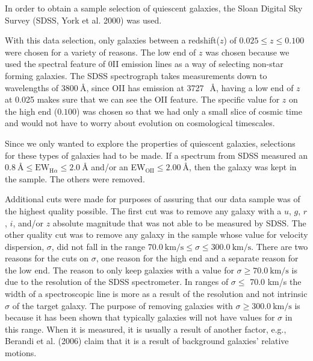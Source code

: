 \documentclass[showcase, preprintnumbers, amsmath, amssymb, bibnotes, 12pt]{revtex4}
\begin{document}
In order to obtain a sample selection of quiescent galaxies, the Sloan Digital Sky Survey (SDSS, York et al. 2000)
was used. 

With this data selection, only galaxies between a redshift($z$) of $0.025\leq z\leq0.100$ were chosen for a variety of reasons. The low end of $z$ was chosen because we used the spectral feature of 0II emission lines as a way of selecting non-star forming galaxies. The SDSS spectrograph takes measurements down to wavelengths of 3800$\ \text{\AA}$, since OII has emission at 3727~$\ \text{\AA}$, having a low end of $z$ at 0.025 makes sure that we can see the OII feature. The specific value for $z$ on the high end ($0.100$) was chosen so that we had only a small slice of cosmic time and would not have to worry about evolution on cosmological timescales.

Since we only wanted to explore the properties of quiescent galaxies, selections for these types of galaxies had to be made. If a spectrum from SDSS measured an $ 0.8\ \text{\AA} \leq \text{EW}_{\text{H}\alpha} \leq 2.0\ \text{\AA}$ and/or an EW$_{\text{OII}} \leq 2.00\ \text{\AA}$, then the galaxy was kept in the sample. The others were removed.

Additional cuts were made for purposes of assuring that our data sample was of the highest quality possible. The first cut was to remove any galaxy with a $u$, $g$, $r$, $i$, and/or $z$ absolute magnitude that was not able to be measured by SDSS.
The other quality cut was to remove any galaxy in the sample whose value for velocity dispersion, $\sigma$, did not fall in the range $70.0\  \text{km/s} \leq \sigma \leq 300.0\  \text{km/s}$. There are two reasons for the cuts on $\sigma$, one reason for the high end and a separate reason for the low end. The reason to only keep galaxies with a value for $\sigma \geq 70.0\ \text{km/s}$ is due to the resolution of the SDSS spectrometer. In ranges of $\sigma \leq$ 70.0 km/s the width of a spectroscopic line is more as a result of the resolution and not intrinsic $\sigma$ of the target galaxy. The purpose of removing galaxies with $\sigma \geq 300.0\ \text{km/s}$ is because it has been shown that typically galaxies will not have values for $\sigma$ in this range. When it is measured, it is usually a result of another factor, e.g., Berandi et al. (2006) claim that it is a result of background galaxies' relative motions.
\end{document}

